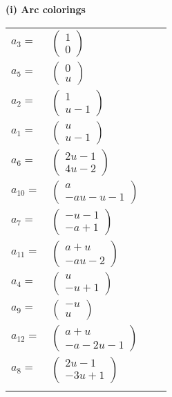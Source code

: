 \documentclass[1p]{elsarticle_modified}
\theoremstyle{definition}
\begin{document}
\flushleft \textbf{(i) Arc colorings}\\
\begin{tabular}{m{7pt} m{180pt} m{7pt} m{180pt} }
\flushright $a_{3}=$&$\begin{pmatrix}1\\0\end{pmatrix}$ \\
\flushright $a_{5}=$&$\begin{pmatrix}0\\u\end{pmatrix}$ \\
\flushright $a_{2}=$&$\begin{pmatrix}1\\u-1\end{pmatrix}$ \\
\flushright $a_{1}=$&$\begin{pmatrix}u\\u-1\end{pmatrix}$ \\
\flushright $a_{6}=$&$\begin{pmatrix}2 u-1\\4 u-2\end{pmatrix}$ \\
\flushright $a_{10}=$&$\begin{pmatrix}a\\- a u- u-1\end{pmatrix}$ \\
\flushright $a_{7}=$&$\begin{pmatrix}- u-1\\- a+1\end{pmatrix}$ \\
\flushright $a_{11}=$&$\begin{pmatrix}a+u\\- a u-2\end{pmatrix}$ \\
\flushright $a_{4}=$&$\begin{pmatrix}u\\- u+1\end{pmatrix}$ \\
\flushright $a_{9}=$&$\begin{pmatrix}- u\\u\end{pmatrix}$ \\
\flushright $a_{12}=$&$\begin{pmatrix}a+u\\- a-2 u-1\end{pmatrix}$ \\
\flushright $a_{8}=$&$\begin{pmatrix}2 u-1\\-3 u+1\end{pmatrix}$\\&\end{tabular}
\end{document}
